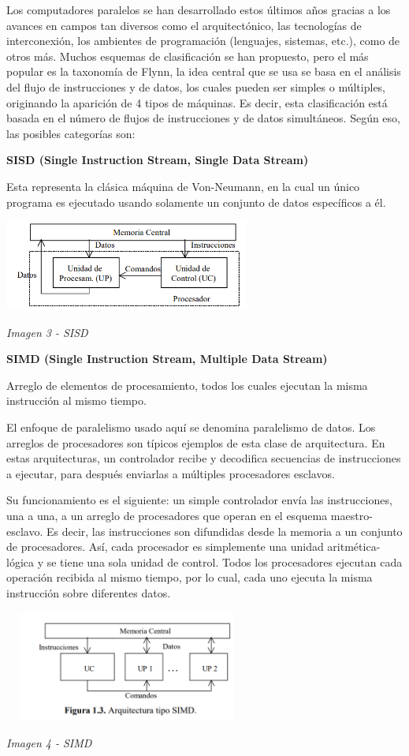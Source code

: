Los computadores paralelos se han desarrollado estos últimos años gracias a los avances en campos tan diversos como el arquitectónico, las tecnologías de interconexión, los ambientes de programación (lenguajes, sistemas, etc.), como de otros más. Muchos esquemas de clasificación se han propuesto, pero el más popular es la taxonomía de Flynn, la idea central que se usa se basa en el análisis del flujo de instrucciones y de datos, los cuales pueden ser simples o múltiples, originando la aparición de 4 tipos de máquinas. Es decir, esta clasificación está basada en el número de flujos de instrucciones y de datos simultáneos. Según eso, las posibles categorías son:

\textbf{SISD (Single Instruction Stream, Single Data Stream)}

Esta representa la clásica máquina de Von-Neumann, en la cual un único programa es ejecutado usando solamente un conjunto de datos específicos a él.

\includegraphics[width=3.18229in,height=1.17579in]{media/image38.png}

\emph{Imagen 3 - SISD}

\textbf{SIMD (Single Instruction Stream, Multiple Data Stream)}

Arreglo de elementos de procesamiento, todos los cuales ejecutan la misma instrucción al mismo tiempo.

El enfoque de paralelismo usado aquí se denomina paralelismo de datos. Los arreglos de procesadores son típicos ejemplos de esta clase de arquitectura. En estas arquitecturas, un controlador recibe y decodifica secuencias de instrucciones a ejecutar, para después enviarlas a múltiples procesadores esclavos.

Su funcionamiento es el siguiente: un simple controlador envía las instrucciones, una a una, a un arreglo de procesadores que operan en el esquema maestro-esclavo. Es decir, las instrucciones son difundidas desde la memoria a un conjunto de procesadores. Así, cada procesador es simplemente una unidad aritmética-lógica y se tiene una sola unidad de control. Todos los procesadores ejecutan cada operación recibida al mismo tiempo, por lo cual, cada uno ejecuta la misma instrucción sobre diferentes datos.

\includegraphics[width=3.19271in,height=1.43274in]{media/image33.png}

\emph{Imagen 4 - SIMD}
